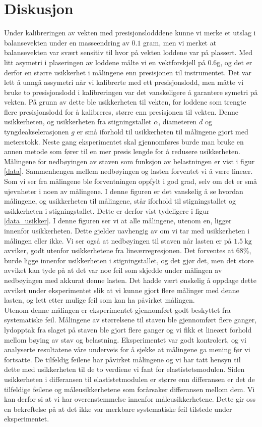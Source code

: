 \documentclass[%
 reprint,
 amsmath,amssymb,
 aps,
 norsk,
 booktabs
]{revtex4-1}
\begin{document}
\section{Diskusjon}
Under kalibreringen av vekten med presisjonslodddene kunne vi merke et utslag i balansevekten under en masseendring av $0.1$ gram, men vi merket at balansevekten var svært sensitiv til hvor på vekten loddene var på plassert. Med litt asymetri i plaseringen av loddene målte vi en vektforskjell på $0.6$g, og det er derfor en større usikkerhet i målingene enn presisjonen til instrumentet. Det var lett å unngå assymetri når vi kalibrerte med ett presisjonslodd, men måtte vi bruke to presisjonslodd i kalibreringen var det vanskeligere å garantere symetri på vekten. På grunn av dette ble usikkerheten til vekten, for loddene som trengte flere presisjonslodd for å kalibreres, større enn presisjonen til vekten. Denne usikkerheten, og usikkerheten fra stigningstallet $\alpha$, diameteren $d$ og tyngdeakselerasjonen $g$ er små iforhold til usikkerheten til målingene gjort med meterstokk. Neste gang eksperimentet skal gjennomføres burde man bruke en annen metode som fører til en mer presis lengde for å redusere usikkerheten.\\
Målingene for nedbøyingen av staven som funksjon av belastningen er vist i figur \vref{data}. Sammenhengen mellem nedbøyingen og lasten forventet vi å være lineær. Som vi ser fra målingene ble forventningen oppfylt i god grad, selv om det er små ujevnheter i noen av målingene. I denne figuren er det vanskelig å se hvordan målingene, og usikkerheten til målingene, står iforhold til stigningstallet og usikkerheten i stigningstallet. Dette er derfor vist tydeligere i figur \vref{data_usikker}. I denne figuren ser vi at alle målingene, utenom en, ligger innenfor usikkerheten. Dette gjelder uavhengig av om vi tar med usikkerheten i målingen eller ikke. Vi ser også at nedbøyingen til staven når lasten er på $\SI{1.5}{\kilo\gram}$ avviker, godt utenfor usikkerhetene fra lineærregresjonen. Det forventes at $68\%$, burde ligge innenfor usikkerheten i stigningstallet, og det gjør det, men det store avviket kan tyde på at det var noe feil som skjedde under målingen av nedbøyingen med akkurat denne lasten. Det hadde vært ønskelig å oppdage dette avviket under eksperimentet slik at vi kunne gjort flere målinger med denne lasten, og lett etter mulige feil som kan ha påvirket målingen.\\
Utenom denne målingen er eksperimentet gjennomført godt beskyttet fra systematiske feil. Målingene av størrelsene til staven ble gjennomført flere ganger, lydopptak fra slaget på staven ble gjort flere ganger og vi fikk et lineært forhold mellom bøying av stav og belastning. Eksperimentet var godt kontrolert, og vi analyserte resultatene våre underveis for å sjekke at målingene ga mening før vi fortsatte. De tilfeldig feilene har påvirket målingene og vi har tatt hensyn til dette med usikkerheten til de to verdiene vi fant for elastistetsmodulen. Siden usikkerheten i differansen til elastistetmodulen er større enn differansen er det de tilfeldige feilene og måleusikkerhetene som forårsaker differansen mellom dem. Vi kan derfor si at vi har overenstemmelse innenfor måleusikkerhetene. Dette gir oss en bekreftelse på at det ikke var merkbare systematiske feil tilstede under eksperimentet.
\end{document}
